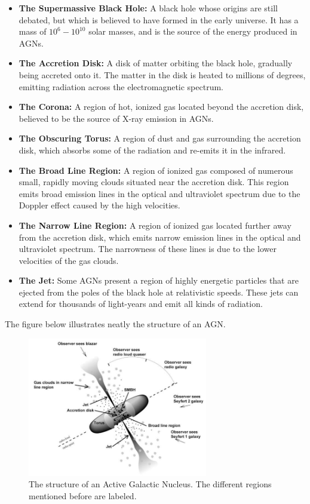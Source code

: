 \begin{itemize}
    \item \textbf{The Supermassive Black Hole:} A black hole whose origins are still debated, but which is believed to have formed in the early universe. It has a mass of $10^6 - 10^{10}$ solar masses, and is the source of the energy produced in AGNs.
    \item \textbf{The Accretion Disk:} A disk of matter orbiting the black hole, gradually being accreted onto it. The matter in the disk is heated to millions of degrees, emitting radiation across the electromagnetic spectrum.
    \item \textbf{The Corona:} A region of hot, ionized gas located beyond the accretion disk, believed to be the source of X-ray emission in AGNs.
    \item \textbf{The Obscuring Torus:} A region of dust and gas surrounding the accretion disk, which absorbs some of the radiation and re-emits it in the infrared.
    \item \textbf{The Broad Line Region:} A region of ionized gas composed of numerous small, rapidly moving clouds situated near the accretion disk. This region emits broad emission lines in the optical and ultraviolet spectrum due to the Doppler effect caused by the high velocities.
    \item \textbf{The Narrow Line Region:} A region of ionized gas located further away from the accretion disk, which emits narrow emission lines in the optical and ultraviolet spectrum. The narrowness of these lines is due to the lower velocities of the gas clouds.
    \item \textbf{The Jet:} Some AGNs present a region of highly energetic particles that are ejected from the poles of the black hole at relativistic speeds. These jets can extend for thousands of light-years and emit all kinds of radiation.
\end{itemize}

The figure below illustrates neatly the structure of an AGN.

\begin{figure}[ht]
    \centering
    \includegraphics[width=0.7\textwidth]{Figures/AGN Structure.jpg}
    \caption{The structure of an Active Galactic Nucleus. The different regions mentioned before are labeled.}
    \label{fig:AGN_structure}
\end{figure}


